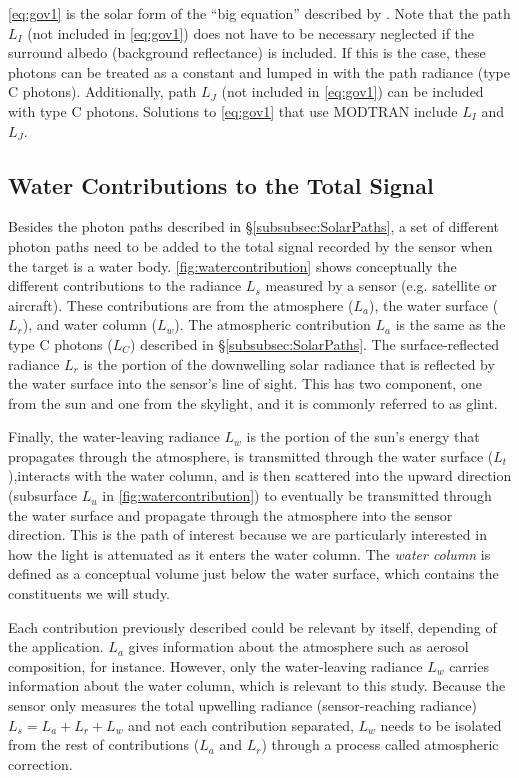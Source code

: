\autoref{eq:gov1} is the solar form of the ``big equation'' described by \cite{Schott}. Note that the path $L_I$ (not included in \autoref{eq:gov1}) does not have to be necessary neglected if the surround albedo (background reflectance) is included. If this is the case, these photons can be treated as a constant and lumped in with the path radiance (type C photons). Additionally, path $L_J$ (not included in \autoref{eq:gov1}) can be included with type C photons. Solutions to \autoref{eq:gov1} that use MODTRAN include $L_I$ and $L_J$.

\subsection{Water Contributions to the Total Signal}
Besides the photon paths described in \S\ref{subsubsec:SolarPaths}, a set of different photon paths need to be added to the total signal recorded by the sensor when the target is a water body. \autoref{fig:watercontribution} shows conceptually the different contributions to the radiance $L_s$ measured by a sensor (e.g. satellite or aircraft). These contributions are from the atmosphere ($L_a$), the water surface ($L_r$), and water column ($L_w$). The atmospheric contribution $L_a$ is the same as the type C photons ($L_C$) described in \S\ref{subsubsec:SolarPaths}. The surface-reflected radiance $L_r$ is the portion of the downwelling solar radiance that is reflected by the water surface into the sensor's line of sight. This has two component, one from the sun and one from the skylight, and it is commonly referred to as glint. 

Finally, the water-leaving radiance $L_w$ is the portion of the sun's energy that propagates through the atmosphere, is transmitted through the water surface ($L_t$),interacts with the water column, and is then scattered into the upward direction (subsurface $L_u$ in \autoref{fig:watercontribution}) to eventually be transmitted through the water surface and propagate through the atmosphere into the sensor direction. This is the path of interest because we are particularly interested in how the light is attenuated as it enters the water column. The {\it water column} is defined as a conceptual volume just below the water surface, which contains the constituents we will study.

Each contribution previously described could be relevant by itself, depending of the application. $L_a$ gives information about the atmosphere such as aerosol composition, for instance. However, only the water-leaving radiance $L_w$ carries information about the water column, which is relevant to this study. Because the sensor only measures the total upwelling radiance (sensor-reaching radiance) $L_s=L_a+L_r+L_w$ and not each contribution separated, $L_w$ needs to be isolated from the rest of contributions ($L_a$ and $L_r$) through a process called atmospheric correction. 

